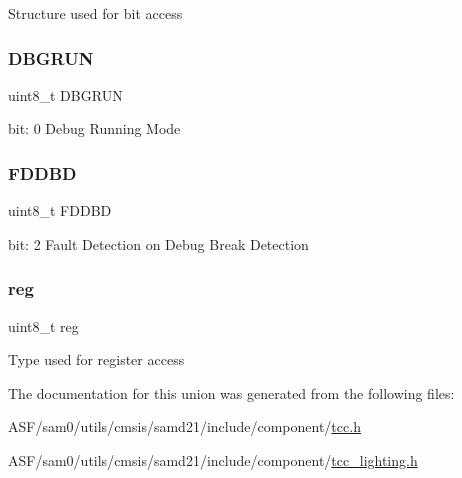 Structure used for bit access \mbox{\label{union_t_c_c___d_b_g_c_t_r_l___type_a1e1cc79f6834369b9dd0c6676a0d8781}} 
\subsubsection{\texorpdfstring{DBGRUN}{DBGRUN}}
{\footnotesize\ttfamily uint8\+\_\+t D\+B\+G\+R\+UN}

bit\+: 0 Debug Running Mode \mbox{\label{union_t_c_c___d_b_g_c_t_r_l___type_a57af8243cff4120d702c9a1191932798}} 
\subsubsection{\texorpdfstring{FDDBD}{FDDBD}}
{\footnotesize\ttfamily uint8\+\_\+t F\+D\+D\+BD}

bit\+: 2 Fault Detection on Debug Break Detection \mbox{\label{union_t_c_c___d_b_g_c_t_r_l___type_a9428adc9af4653a2050e2536b55dec8d}} 
\subsubsection{\texorpdfstring{reg}{reg}}
{\footnotesize\ttfamily uint8\+\_\+t reg}

Type used for register access 

The documentation for this union was generated from the following files\+:\begin{DoxyCompactItemize}
\item 
A\+S\+F/sam0/utils/cmsis/samd21/include/component/\mbox{\hyperlink{tcc_8h}{tcc.\+h}}\item 
A\+S\+F/sam0/utils/cmsis/samd21/include/component/\mbox{\hyperlink{tcc__lighting_8h}{tcc\+\_\+lighting.\+h}}\end{DoxyCompactItemize}
